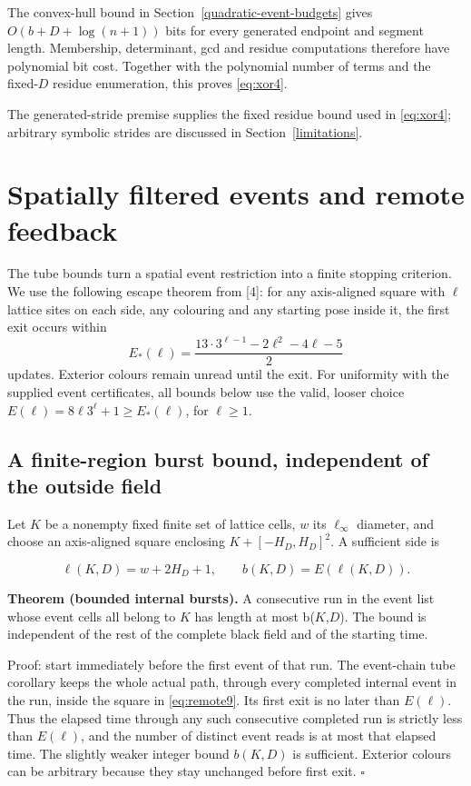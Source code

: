 \documentclass[
  11pt,
]{article}
\begin{document}
The convex-hull bound in Section~\ref{quadratic-event-budgets} gives
$O(b+D+\log(n+1))$ bits for every generated endpoint and segment length.
Membership, determinant, gcd and residue computations therefore have
polynomial bit cost. Together with the polynomial number of terms and the
fixed-$D$ residue enumeration, this proves \eqref{eq:xor4}.

The generated-stride premise supplies the fixed residue bound used in
\eqref{eq:xor4}; arbitrary symbolic strides are discussed in
Section~\ref{limitations}.

\section{Spatially filtered events and remote feedback}\label{endpoint-tubes-and-spatially-filtered-feedback}
The tube bounds turn a spatial event restriction into a finite stopping
criterion. We use the following escape theorem from {[}4{]}: for any
axis-aligned square with $\ell$ lattice sites on each side, any colouring
and any starting pose inside it, the first exit occurs within
\[
 E_*(\ell)=\frac{13\cdot3^{\ell-1}-2\ell^2-4\ell-5}{2}
\]
updates. Exterior colours remain unread until the exit. For uniformity with
the supplied event certificates, all bounds below use the valid, looser
choice $E(\ell)=8\ell3^\ell+1\ge E_*(\ell)$, for $\ell\ge1$.

\subsection{A finite-region burst bound, independent of the outside
field}\label{remote-4}

Let \(K\) be a nonempty fixed finite set of lattice cells, \(w\) its $\ell_\infty$
diameter, and choose an axis-aligned square enclosing
$K+[-H_D,H_D]^2$. A sufficient side is

\begin{equation}\label{eq:remote9}
\ell(K,D)=w+2H_D+1,\qquad b(K,D)=E(\ell(K,D)).
\end{equation}

\textbf{Theorem (bounded internal bursts).} A consecutive run in the
event list whose event cells all belong to \(K\) has length at most b(\(K\),\(D\)).
The bound is independent of the rest of the complete black field and of
the starting time.

Proof: start immediately before the first event of that run. The event-chain tube corollary
keeps the whole actual path, through every completed internal event in
the run, inside the square in \eqref{eq:remote9}. Its first exit is no later than
\(E(\ell)\). Thus the elapsed time through any such consecutive completed run
is strictly less than \(E(\ell)\), and the number of distinct event reads is
at most that elapsed time. The slightly weaker integer bound $b(K,D)$ is
sufficient. Exterior colours can be arbitrary because they stay
unchanged before first exit. \(\square\)
\end{document}
